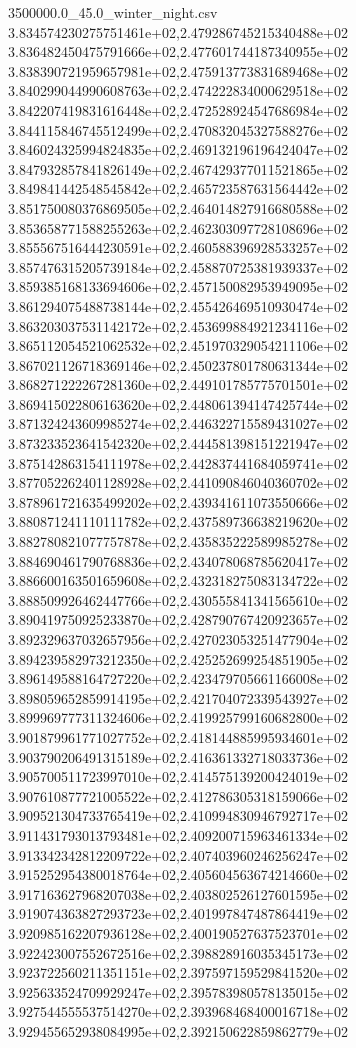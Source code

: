 \begin{filecontents*}{3500000.0_45.0_winter_night.csv}
3.834574230275751461e+02,2.479286745215340488e+02
3.836482450475791666e+02,2.477601744187340955e+02
3.838390721959657981e+02,2.475913773831689468e+02
3.840299044990608763e+02,2.474222834000629518e+02
3.842207419831616448e+02,2.472528924547686984e+02
3.844115846745512499e+02,2.470832045327588276e+02
3.846024325994824835e+02,2.469132196196424047e+02
3.847932857841826149e+02,2.467429377011521865e+02
3.849841442548545842e+02,2.465723587631564442e+02
3.851750080376869505e+02,2.464014827916680588e+02
3.853658771588255263e+02,2.462303097728108696e+02
3.855567516444230591e+02,2.460588396928533257e+02
3.857476315205739184e+02,2.458870725381939337e+02
3.859385168133694606e+02,2.457150082953949095e+02
3.861294075488738144e+02,2.455426469510930474e+02
3.863203037531142172e+02,2.453699884921234116e+02
3.865112054521062532e+02,2.451970329054211106e+02
3.867021126718369146e+02,2.450237801780631344e+02
3.868271222267281360e+02,2.449101785775701501e+02
3.869415022806163620e+02,2.448061394147425744e+02
3.871324243609985274e+02,2.446322715589431027e+02
3.873233523641542320e+02,2.444581398151221947e+02
3.875142863154111978e+02,2.442837441684059741e+02
3.877052262401128928e+02,2.441090846040360702e+02
3.878961721635499202e+02,2.439341611073550666e+02
3.880871241110111782e+02,2.437589736638219620e+02
3.882780821077757878e+02,2.435835222589985278e+02
3.884690461790768836e+02,2.434078068785620417e+02
3.886600163501659608e+02,2.432318275083134722e+02
3.888509926462447766e+02,2.430555841341565610e+02
3.890419750925233870e+02,2.428790767420923657e+02
3.892329637032657956e+02,2.427023053251477904e+02
3.894239582973212350e+02,2.425252699254851905e+02
3.896149588164727220e+02,2.423479705661166008e+02
3.898059652859914195e+02,2.421704072339543927e+02
3.899969777311324606e+02,2.419925799160682800e+02
3.901879961771027752e+02,2.418144885995934601e+02
3.903790206491315189e+02,2.416361332718033736e+02
3.905700511723997010e+02,2.414575139200424019e+02
3.907610877721005522e+02,2.412786305318159066e+02
3.909521304733765419e+02,2.410994830946792717e+02
3.911431793013793481e+02,2.409200715963461334e+02
3.913342342812209722e+02,2.407403960246256247e+02
3.915252954380018764e+02,2.405604563674214660e+02
3.917163627968207038e+02,2.403802526127601595e+02
3.919074363827293723e+02,2.401997847487864419e+02
3.920985162207936128e+02,2.400190527637523701e+02
3.922423007552672516e+02,2.398828916035345173e+02
3.923722560211351151e+02,2.397597159529841520e+02
3.925633524709929247e+02,2.395783980578135015e+02
3.927544555537514270e+02,2.393968468400016718e+02
3.929455652938084995e+02,2.392150622859862779e+02

\end{filecontents*}
